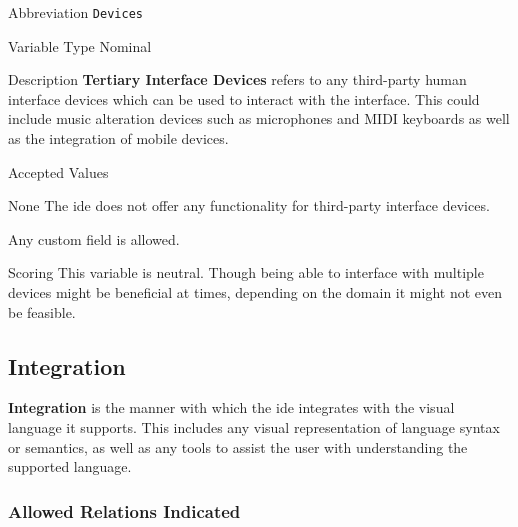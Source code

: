 \begin{AlignedDesc}
  \item[Abbreviation] \texttt{Devices}

  \item[Variable Type] Nominal

  \item[Description] \textbf{Tertiary Interface Devices} refers to any
  third-party human interface devices which can be used to interact with
  the interface. This could include music alteration devices such as
  microphones and MIDI keyboards as well as the integration of mobile
  devices.

  \item[Accepted Values]

  \begin{AlignedDesc}
    \item[None] The \ac{ide} does not offer any functionality for
    third-party interface devices.
    \item[\textellipsis] Any custom field is allowed.
  \end{AlignedDesc}

  \item[Scoring] This variable is neutral. Though being able to interface
  with multiple devices might be beneficial at times, depending on the
  domain it might not even be feasible.

\end{AlignedDesc}


\subsection{Integration}
\label{subsec:integration}

\textbf{Integration} is the manner with which the \ac{ide} integrates with
the visual language it supports. This includes any visual representation of
language syntax or semantics, as well as any tools to assist the user with
understanding the supported language.

\subsubsection{Allowed Relations Indicated}
\label{subsubsec:relations}

